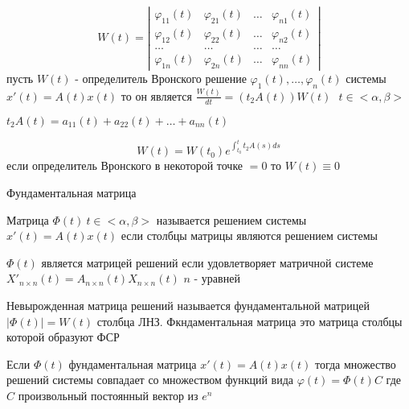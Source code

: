 \begin{theorem}
  $$
  W(t) =
  \left|
  \begin{array}{cccc}
    \varphi_{11}(t) & \varphi_{21}(t) & \ldots & \varphi_{n1}(t) \\
    \varphi_{12}(t) & \varphi_{22}(t) & \ldots & \varphi_{n2}(t) \\
    \ldots & \ldots & \ldots & \ldots \\
    \varphi_{1n}(t) & \varphi_{2n}(t) & \ldots & \varphi_{nn}(t)
  \end{array}
  \right|
  $$
  пусть $W(t)$ - определитель Вронского решение $\varphi_1(t), \ldots,
  \varphi_n(t)$ системы $x'(t) = A(t)x(t)$ то он является
  $\frac{W(t)}{dt} = (t_2A(t))W(t) ~~~ t \in <\alpha, \beta>$

  $t_2A(t) = a_{11}(t) + a_{22}(t) + \ldots + a_{nn}(t)$
\end{theorem}

\begin{block}
  $$
  W(t) = W(t_0)e^{\int_{t_0}^t t_2 A(s)ds}
  $$
  если определитель Вронского в некоторой точке $= 0$ то $W(t) \equiv 0$
\end{block}

\begin{title}[\Large]
  Фундаментальная матрица
\end{title}

\begin{define}
  Матрица $\Phi(t) ~ t \in <\alpha, \beta>$ называется решением системы
  $x'(t) = A(t)x(t)$ если столбцы матрицы являются решением системы
\end{define}

\begin{block}[Утверждение]
  $\Phi(t)$ является матрицей решений если удовлетворяет матричной системе
  $X'_{n \times n}(t) = A_{n \times n}(t) X_{n \times n}(t)$ $n$ - уравней
\end{block}

\begin{define}
  Невырожденная матрица решений называется фундаментальной матрицей
  $|\Phi(t)| = W(t)$ столбца ЛНЗ. Фкндаментальная матрица это матрица столбцы
  которой образуют ФСР
\end{define}

\begin{block}[Предложение]
  Если $\Phi(t)$ фундаментальная матрица $x'(t) = A(t)x(t)$
  тогда множество решений системы совпадает со множеством функций вида
  $\varphi(t) = \Phi(t)C$ где $C$ произвольный постоянный вектор из $e^n$
\end{block}

